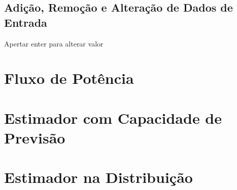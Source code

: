 \documentclass{article}
\begin{document}
\subsection{Adição, Remoção e Alteração de Dados de Entrada}
Apertar enter para alterar valor


\section{Fluxo de Potência}

\section{Estimador com Capacidade de Previsão}

\section{Estimador na Distribuição}
\end{document}
